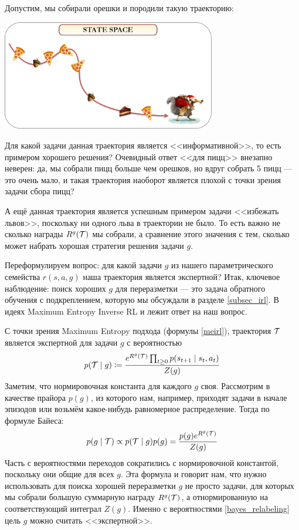 \begin{exampleBox}[label=ex:multitask]{}
Допустим, мы собирали орешки и породили такую траекторию:

\begin{center}
    \includegraphics[width=0.7\textwidth]{Images/MultiTask1}
\end{center}

Для какой задачи данная траектория является <<информативной>>, то есть примером хорошего решения? Очевидный ответ <<для пицц>> внезапно неверен: да, мы собрали пицц больше чем орешков, но вдруг собрать 5 пицц --- это очень мало, и такая траектория наоборот является плохой с точки зрения задачи сбора пицц?

А ещё данная траектория является успешным примером задачи <<избежать львов>>, поскольку ни одного льва в траектории не было. То есть важно не сколько награды $R^g(\mathcal{T})$ мы собрали, а сравнение этого значения с тем, сколько может набрать хорошая стратегия решения задачи $g$.
\end{exampleBox}

Переформулируем вопрос: для какой задачи $g$ из нашего параметрического семейства $r(s, a, g)$ наша траектория является экспертной? Итак, ключевое наблюдение: поиск хороших $g$ для переразметки --- это задача обратного обучения с подкреплением, которую мы обсуждали в разделе \ref{subsec_irl}. В идеях Maximum Entropy Inverse RL и лежит ответ на наш вопрос.

С точки зрения Maximum Entropy подхода (формулы \eqref{meirl}), траектория $\mathcal{T}$ является экспертной для задачи $g$ с вероятностью
$$p(\mathcal{T} \mid g) \coloneqq \frac{e^{R^g(\mathcal{T})} \prod_{t \ge 0}p(s_{t+1} \mid s_t, a_t)}{Z(g)}$$
Заметим, что нормировочная константа для каждого $g$ своя. Рассмотрим в качестве прайора $p(g)$, из которого нам, например, приходят задачи в начале эпизодов или возьмём какое-нибудь равномерное распределение. Тогда по формуле Байеса:
\begin{equation}\label{bayes_relabeling}
p(g \mid \mathcal{T}) \propto p(\mathcal{T} \mid g)p(g) = \frac{p(g) e^{R^g(\mathcal{T})}}{Z(g)}
\end{equation}
Часть с вероятностями переходов сократились с нормировочной константой, поскольку они общие для всех $g$. Эта формула и говорит нам, что нужно использовать для поиска хорошей переразметки $g$ не просто задачи, для которых мы собрали большую суммарную награду $R^g(\mathcal{T})$, а отнормированную на соответствующий интеграл $Z(g)$. Именно с вероятностями \eqref{bayes_relabeling} цель $g$ можно считать <<экспертной>>.


